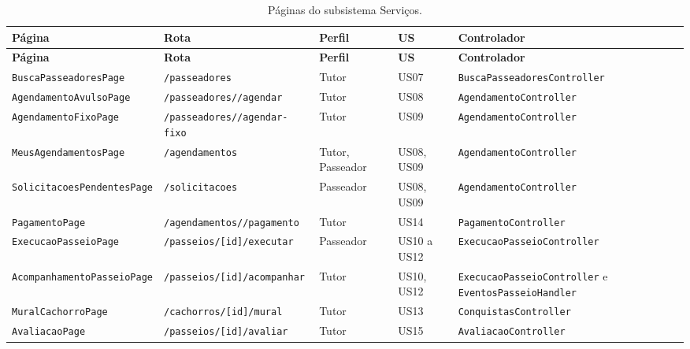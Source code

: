 \begin{scriptsize}
\setlength{\tabcolsep}{3pt}
\begin{longtable}{|p{4.2cm}|p{3.6cm}|p{1.7cm}|p{1.3cm}|p{3.8cm}|}
	\caption{Páginas do subsistema Serviços.}
	\label{tabela-ciu-servicos}\\\hline
	\rowcolor{lightgray}
	\textbf{Página} & \textbf{Rota} & \textbf{Perfil} & \textbf{US} & \textbf{Controlador} \\\hline
	\endfirsthead
	\hline
	\rowcolor{lightgray}
	\textbf{Página} & \textbf{Rota} & \textbf{Perfil} & \textbf{US} & \textbf{Controlador} \\\hline
	\endhead
	\texttt{BuscaPasseadoresPage} & \texttt{/passeadores} & Tutor & US07 & \texttt{BuscaPasseadores\-Controller} \\\hline
	\texttt{AgendamentoAvulsoPage} & \texttt{/passeadores/\allowbreak [id]/agendar} & Tutor & US08 & \texttt{Agendamento\-Controller} \\\hline
	\texttt{AgendamentoFixoPage} & \texttt{/passeadores/\allowbreak [id]/agendar-fixo} & Tutor & US09 & \texttt{Agendamento\-Controller} \\\hline
	\texttt{MeusAgendamentosPage} & \texttt{/agendamentos} & Tutor, Passeador & US08, US09 & \texttt{Agendamento\-Controller} \\\hline
	\texttt{Solicitacoes\-PendentesPage} & \texttt{/solicitacoes} & Passeador & US08, US09 & \texttt{Agendamento\-Controller} \\\hline
	\texttt{PagamentoPage} & \texttt{/agendamentos/\allowbreak [id]/pagamento} & Tutor & US14 & \texttt{Pagamento\-Controller} \\\hline
	\texttt{ExecucaoPasseioPage} & \texttt{/passeios/[id]/\allowbreak executar} & Passeador & US10 a US12 & \texttt{ExecucaoPasseio\-Controller} \\\hline
	\texttt{Acompanhamento\-PasseioPage} & \texttt{/passeios/[id]/\allowbreak acompanhar} & Tutor & US10, US12 & \texttt{ExecucaoPasseio\-Controller} e \texttt{EventosPasseio\-Handler} \\\hline
	\texttt{MuralCachorroPage} & \texttt{/cachorros/[id]/\allowbreak mural} & Tutor & US13 & \texttt{Conquistas\-Controller} \\\hline
	\texttt{AvaliacaoPage} & \texttt{/passeios/[id]/\allowbreak avaliar} & Tutor & US15 & \texttt{Avaliacao\-Controller} \\\hline
\end{longtable}
\end{scriptsize}


